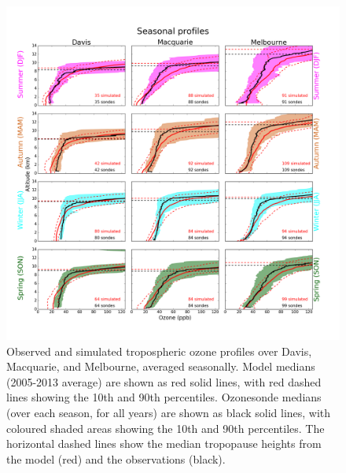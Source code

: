 \documentclass[acp, manuscript]{copernicus} %
\begin{document}
  \begin{figure}
    \includegraphics[width=14.0cm]{figures/seasonalprofiles00.png}
    \caption{%
      Observed and simulated tropospheric ozone profiles over Davis, Macquarie, and Melbourne, averaged seasonally.
      Model medians (2005-2013 average) are shown as red solid lines, with red dashed lines showing the 10th and 90th percentiles.
      Ozonesonde medians (over each season, for all years) are shown as black solid lines, with coloured shaded areas showing the 10th and 90th percentiles.
      The horizontal dashed lines show the median tropopause heights from the model (red) and the observations (black).}
    \label{fig:GEOSChemSeasonalProfiles}
  \end{figure}
  
\end{document}

